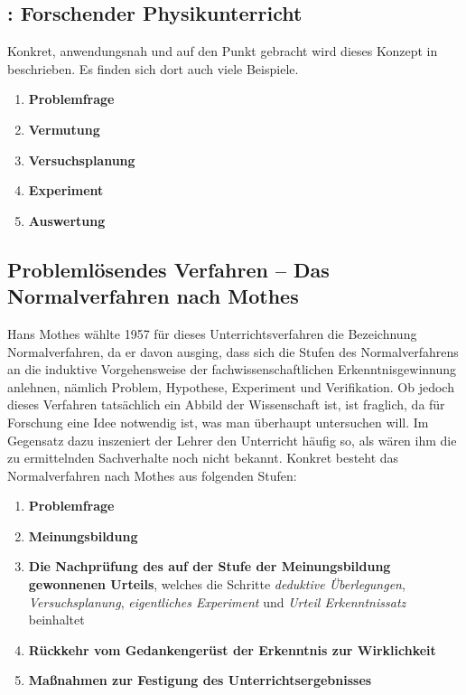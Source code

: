 \subsection{\textcite{Ploeger}: Forschender Physikunterricht}

Konkret, anwendungsnah und auf den Punkt gebracht wird dieses Konzept in
\textcite{Ploeger} beschrieben.
Es finden sich dort auch viele Beispiele.
\begin{enumerate}
	\item {\bf Problemfrage}
	\item {\bf Vermutung}
	\item {\bf Versuchsplanung}
	\item {\bf Experiment}
	\item {\bf Auswertung}
\end{enumerate}

\subsection{Probleml\"{o}sendes Verfahren -- Das Normalverfahren nach Mothes}

Hans Mothes w\"{a}hlte 1957 f\"{u}r dieses Unterrichtsverfahren die Bezeichnung \glqq Normalverfahren\grqq, da er davon ausging, dass sich die Stufen des Normalverfahrens an die induktive Vorgehensweise der fachwissenschaftlichen Erkenntnisgewinnung anlehnen, n\"{a}mlich Problem, Hypothese, Experiment und Verifikation. Ob jedoch dieses Verfahren tats\"{a}chlich ein Abbild der Wissenschaft ist, ist fraglich, da f\"{u}r Forschung eine Idee notwendig ist, was man \"{u}berhaupt untersuchen will. Im Gegensatz dazu inszeniert der Lehrer den Unterricht h\"{a}ufig so, als w\"{a}ren ihm die zu ermittelnden Sachverhalte noch nicht bekannt. Konkret besteht das Normalverfahren nach Mothes aus folgenden Stufen:

\begin{enumerate}
	\item {\bf Problemfrage}
	\item {\bf Meinungsbildung}
	\item {\bf Die Nachpr\"{u}fung des auf der Stufe der Meinungsbildung gewonnenen Urteils}, welches die Schritte \emph{deduktive \"{U}berlegungen}, \emph{Versuchsplanung},  \emph{eigentliches Experiment} und \emph{Urteil Erkenntnissatz} beinhaltet
	\item {\bf R\"{u}ckkehr vom Gedankenger\"{u}st der Erkenntnis zur Wirklichkeit}
	\item {\bf Ma\ss nahmen zur Festigung des Unterrichtsergebnisses}
\end{enumerate}

